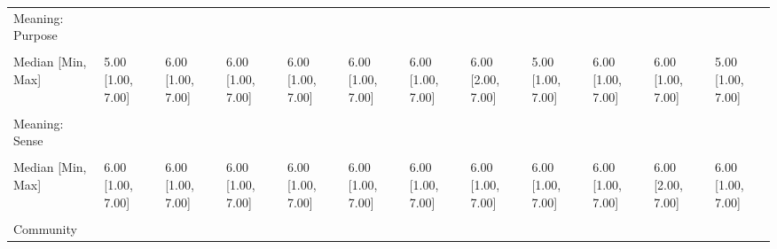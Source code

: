 \documentclass[
  single column]{article}
\begin{document}
\begin{landscape}
\begin{longtable}[t]{llllllllllll}
\addlinespace
Meaning: Purpose &  &  &  &  &  &  &  &  &  &  & \\
\cellcolor{gray!10}{Mean (SD)} & \cellcolor{gray!10}{4.89 (1.51)} & \cellcolor{gray!10}{5.41 (1.28)} & \cellcolor{gray!10}{5.33 (1.40)} & \cellcolor{gray!10}{5.31 (1.39)} & \cellcolor{gray!10}{5.49 (1.40)} & \cellcolor{gray!10}{5.57 (1.34)} & \cellcolor{gray!10}{5.58 (1.28)} & \cellcolor{gray!10}{4.95 (1.70)} & \cellcolor{gray!10}{5.66 (1.42)} & \cellcolor{gray!10}{5.34 (1.32)} & \cellcolor{gray!10}{5.01 (1.70)}\\
Median [Min, Max] & 5.00 [1.00, 7.00] & 6.00 [1.00, 7.00] & 6.00 [1.00, 7.00] & 6.00 [1.00, 7.00] & 6.00 [1.00, 7.00] & 6.00 [1.00, 7.00] & 6.00 [2.00, 7.00] & 5.00 [1.00, 7.00] & 6.00 [1.00, 7.00] & 6.00 [1.00, 7.00] & 5.00 [1.00, 7.00]\\
\cellcolor{gray!10}{Missing} & \cellcolor{gray!10}{1508 (7.0\%)} & \cellcolor{gray!10}{79 (5.8\%)} & \cellcolor{gray!10}{25 (9.3\%)} & \cellcolor{gray!10}{172 (8.5\%)} & \cellcolor{gray!10}{270 (7.3\%)} & \cellcolor{gray!10}{86 (7.9\%)} & \cellcolor{gray!10}{12 (8.8\%)} & \cellcolor{gray!10}{11 (12.6\%)} & \cellcolor{gray!10}{25 (3.8\%)} & \cellcolor{gray!10}{35 (6.1\%)} & \cellcolor{gray!10}{67 (9.0\%)}\\
Meaning: Sense &  &  &  &  &  &  &  &  &  &  & \\
\addlinespace
\cellcolor{gray!10}{Mean (SD)} & \cellcolor{gray!10}{5.61 (1.29)} & \cellcolor{gray!10}{5.90 (1.08)} & \cellcolor{gray!10}{5.98 (1.20)} & \cellcolor{gray!10}{5.80 (1.20)} & \cellcolor{gray!10}{6.02 (1.17)} & \cellcolor{gray!10}{6.02 (1.19)} & \cellcolor{gray!10}{5.89 (1.15)} & \cellcolor{gray!10}{5.79 (1.44)} & \cellcolor{gray!10}{5.80 (1.32)} & \cellcolor{gray!10}{5.92 (1.04)} & \cellcolor{gray!10}{5.73 (1.37)}\\
Median [Min, Max] & 6.00 [1.00, 7.00] & 6.00 [1.00, 7.00] & 6.00 [1.00, 7.00] & 6.00 [1.00, 7.00] & 6.00 [1.00, 7.00] & 6.00 [1.00, 7.00] & 6.00 [1.00, 7.00] & 6.00 [1.00, 7.00] & 6.00 [1.00, 7.00] & 6.00 [2.00, 7.00] & 6.00 [1.00, 7.00]\\
\cellcolor{gray!10}{Missing} & \cellcolor{gray!10}{1243 (5.8\%)} & \cellcolor{gray!10}{51 (3.7\%)} & \cellcolor{gray!10}{17 (6.3\%)} & \cellcolor{gray!10}{113 (5.6\%)} & \cellcolor{gray!10}{193 (5.2\%)} & \cellcolor{gray!10}{54 (4.9\%)} & \cellcolor{gray!10}{10 (7.4\%)} & \cellcolor{gray!10}{9 (10.3\%)} & \cellcolor{gray!10}{11 (1.7\%)} & \cellcolor{gray!10}{24 (4.2\%)} & \cellcolor{gray!10}{52 (7.0\%)}\\
Community &  &  &  &  &  &  &  &  &  &  & \\

\end{longtable}
\end{landscape}
\end{document}

